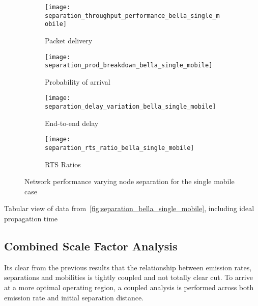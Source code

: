 \begin{figure}[bp!]
	\begin{subfigure}[t]{0.5\textwidth}
		\centering
		\texttt{[image: separation\_throughput\_performance\_bella\_single\_mobile]}
		\caption{Packet delivery}
		\label{fig:separation_throughput_performance_bella_single_mobile}
	\end{subfigure}
	\begin{subfigure}[t]{0.5\textwidth}
		\centering
		\texttt{[image: separation\_prod\_breakdown\_bella\_single\_mobile]}
		\caption{Probability of arrival}
		\label{fig:separation_prod_breakdown_bella_single_mobile}
	\end{subfigure}
	
	\begin{subfigure}[t]{0.5\textwidth}
		\centering
		\texttt{[image: separation\_delay\_variation\_bella\_single\_mobile]}
		\caption{End-to-end delay}
		\label{fig:separation_delay_variation_bella_single_mobile}
	\end{subfigure}
	\begin{subfigure}[t]{0.5\textwidth}
		\centering
		\texttt{[image: separation\_rts\_ratio\_bella\_single\_mobile]}
		\caption{RTS Ratios}
		\label{fig:separation_rts_ratio_bella_single_mobile}
	\end{subfigure}
	\caption{Network performance varying node separation for the single mobile case}
	\label{fig:separation_bella_single_mobile}
\end{figure}


\begin{table}[h]
	\caption{Tabular view of data from~\autoref{fig:separation_bella_single_mobile}, including ideal propagation time} \label{tab:separation_bella_single_mobile}
	\begin{center}
		
	\end{center}
\end{table}

\clearpage

\subsection{Combined Scale Factor Analysis}

Its clear from the previous results that the relationship between emission rates, separations and mobilities is tightly coupled and not totally clear cut. 
To arrive at a more optimal operating region, a coupled analysis is performed across both emission rate and initial separation distance.

